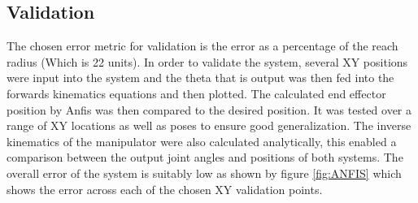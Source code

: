 \documentclass[a4paper,11pt]{article}
\begin{document}

\subsection{Validation}
The chosen error metric for validation is the error as a percentage of the reach radius (Which is 22 units). In order to validate the system, several XY positions were input into the system and the theta that is output was then fed into the forwards kinematics equations and then plotted. The calculated end effector position by Anfis was then compared to the desired position. It was tested over a range of XY locations as well as poses to ensure good generalization.
The inverse kinematics of the manipulator were also calculated analytically, this enabled a comparison between the output joint angles and positions of both systems. The overall error of the system is suitably low as shown by figure \ref{fig:ANFIS}
which shows the error across each of the chosen XY validation points.

\end{document}
